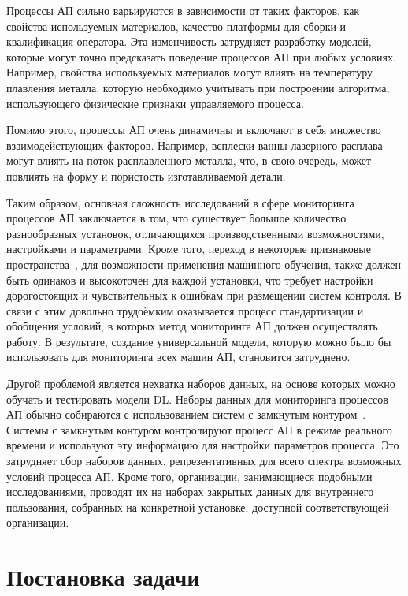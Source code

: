 \documentclass{article}
\begin{document}
    Процессы АП сильно варьируются в зависимости от таких факторов, как свойства используемых материалов, качество платформы для сборки и квалификация оператора. Эта изменчивость затрудняет разработку моделей, которые могут точно предсказать поведение процессов АП при любых условиях. Например, свойства используемых материалов могут влиять на температуру плавления металла, которую необходимо учитывать при построении алгоритма, использующего физические признаки управляемого процесса.~\cite{am_materials}

    Помимо этого, процессы АП очень динамичны и включают в себя множество взаимодействующих факторов. Например, всплески ванны лазерного расплава могут влиять на поток расплавленного металла, что, в свою очередь, может повлиять на форму и пористость изготавливаемой детали.

    Таким образом, основная сложность исследований в сфере мониторинга процессов АП заключается в том, что существует большое количество разнообразных установок, отличающихся производственными возможностями, настройками и параметрами. Кроме того, переход в некоторые признаковые пространства~\cite{ml_am_materials}, для возможности применения машинного обучения, также должен быть одинаков и высокоточен для каждой установки, что требует настройки дорогостоящих и чувствительных к ошибкам при размещении систем контроля. В связи с этим довольно трудоёмким оказывается процесс стандартизации и обобщения условий, в которых метод мониторинга АП должен осуществлять работу. В результате, создание универсальной модели, которую можно было бы использовать для мониторинга всех машин АП, становится затруднено.
    
    Другой проблемой является нехватка наборов данных, на основе которых можно обучать и тестировать модели DL. Наборы данных для мониторинга процессов АП обычно собираются с использованием систем с замкнутым контуром~\cite{closed-loop}. Системы с замкнутым контуром контролируют процесс АП в режиме реального времени и используют эту информацию для настройки параметров процесса. Это затрудняет сбор наборов данных, репрезентативных для всего спектра возможных условий процесса АП. Кроме того, организации, занимающиеся подобными исследованиями, проводят их на наборах закрытых данных для внутреннего пользования, собранных на конкретной установке, доступной соответствующей организации.

\section{Постановка задачи}
\end{document}

